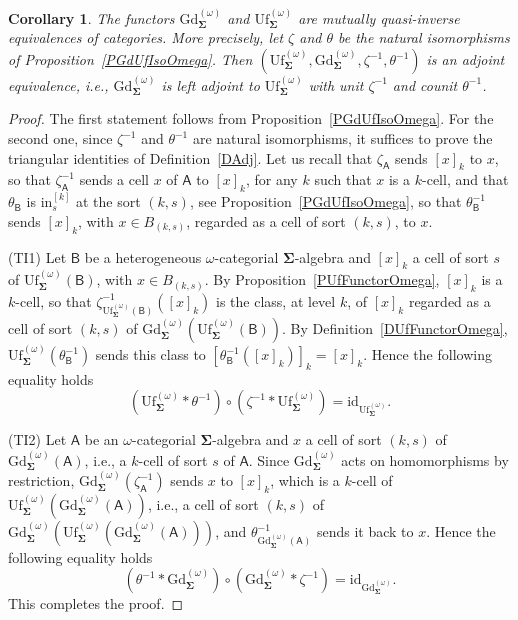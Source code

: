 \documentclass[a4paper, reqno]{amsbook}
\newcommand{\sig}[1]{\mathbf{#1}}             %
\newcommand{\calg}[1]{\boldsymbol{\mathsf{#1}}} %
\newcommand{\id}{\mathrm{id}}
\newcommand{\Gd}{\mathrm{Gd}}
\newcommand{\Uf}{\mathrm{Uf}}
\theoremstyle{plain}
\newtheorem{corollary}[theorem]{Corollary}
\theoremstyle{definition}
\begin{document}
\begin{corollary}\label{CGdUfEquivOmega}
The functors $\Gd^{(\omega)}_{\sig{\Sigma}}$ and $\Uf^{(\omega)}_{\sig{\Sigma}}$ are mutually quasi-inverse equivalences of categories.
More precisely, let $\zeta$ and $\theta$ be the natural isomorphisms of Proposition~\ref{PGdUfIsoOmega}.
Then $(\Uf^{(\omega)}_{\sig{\Sigma}},\Gd^{(\omega)}_{\sig{\Sigma}},\zeta^{-1},\theta^{-1})$ is an adjoint equivalence, i.e., $\Gd^{(\omega)}_{\sig{\Sigma}}$ is left adjoint to $\Uf^{(\omega)}_{\sig{\Sigma}}$ with unit $\zeta^{-1}$ and counit $\theta^{-1}$.
\end{corollary}
\begin{proof}
The first statement follows from Proposition~\ref{PGdUfIsoOmega}.
For the second one, since $\zeta^{-1}$ and $\theta^{-1}$ are natural isomorphisms, it suffices to prove the triangular identities of Definition~\ref{DAdj}.
Let us recall that $\zeta_{\calg{A}}$ sends $[x]_{k}$ to $x$, so that $\zeta^{-1}_{\calg{A}}$ sends a cell $x$ of $\calg{A}$ to $[x]_{k}$, for any $k$ such that $x$ is a $k$-cell, and that $\theta_{\calg{B}}$ is $\mathrm{in}^{[k]}_{s}$ at the sort $(k,s)$, see Proposition~\ref{PGdUfIsoOmega}, so that $\theta^{-1}_{\calg{B}}$ sends $[x]_{k}$, with $x\in B_{(k,s)}$, regarded as a cell of sort $(k,s)$, to $x$.

(TI1) Let $\calg{B}$ be a heterogeneous $\omega$-categorial $\sig{\Sigma}$-algebra and $[x]_{k}$ a cell of sort $s$ of $\Uf^{(\omega)}_{\sig{\Sigma}}(\calg{B})$, with $x\in B_{(k,s)}$.
By Proposition~\ref{PUfFunctorOmega}, $[x]_{k}$ is a $k$-cell, so that $\zeta^{-1}_{\Uf^{(\omega)}_{\sig{\Sigma}}(\calg{B})}([x]_{k})$ is the class, at level $k$, of $[x]_{k}$ regarded as a cell of sort $(k,s)$ of $\Gd^{(\omega)}_{\sig{\Sigma}}(\Uf^{(\omega)}_{\sig{\Sigma}}(\calg{B}))$.
By Definition~\ref{DUfFunctorOmega}, $\Uf^{(\omega)}_{\sig{\Sigma}}(\theta^{-1}_{\calg{B}})$ sends this class to $[\theta^{-1}_{\calg{B}}([x]_{k})]_{k}=[x]_{k}$.
Hence the following equality holds
$$
(\Uf^{(\omega)}_{\sig{\Sigma}}\ast\theta^{-1})\circ(\zeta^{-1}\ast\Uf^{(\omega)}_{\sig{\Sigma}})=\id_{\Uf^{(\omega)}_{\sig{\Sigma}}}.
$$

(TI2) Let $\calg{A}$ be an $\omega$-categorial $\sig{\Sigma}$-algebra and $x$ a cell of sort $(k,s)$ of $\Gd^{(\omega)}_{\sig{\Sigma}}(\calg{A})$, i.e., a $k$-cell of sort $s$ of $\calg{A}$.
Since $\Gd^{(\omega)}_{\sig{\Sigma}}$ acts on homomorphisms by restriction, $\Gd^{(\omega)}_{\sig{\Sigma}}(\zeta^{-1}_{\calg{A}})$ sends $x$ to $[x]_{k}$, which is a $k$-cell of $\Uf^{(\omega)}_{\sig{\Sigma}}(\Gd^{(\omega)}_{\sig{\Sigma}}(\calg{A}))$, i.e., a cell of sort $(k,s)$ of $\Gd^{(\omega)}_{\sig{\Sigma}}(\Uf^{(\omega)}_{\sig{\Sigma}}(\Gd^{(\omega)}_{\sig{\Sigma}}(\calg{A})))$, and $\theta^{-1}_{\Gd^{(\omega)}_{\sig{\Sigma}}(\calg{A})}$ sends it back to $x$.
Hence the following equality holds
$$
(\theta^{-1}\ast\Gd^{(\omega)}_{\sig{\Sigma}})\circ(\Gd^{(\omega)}_{\sig{\Sigma}}\ast\zeta^{-1})=\id_{\Gd^{(\omega)}_{\sig{\Sigma}}}.
$$
This completes the proof.
\end{proof}
\end{document}
